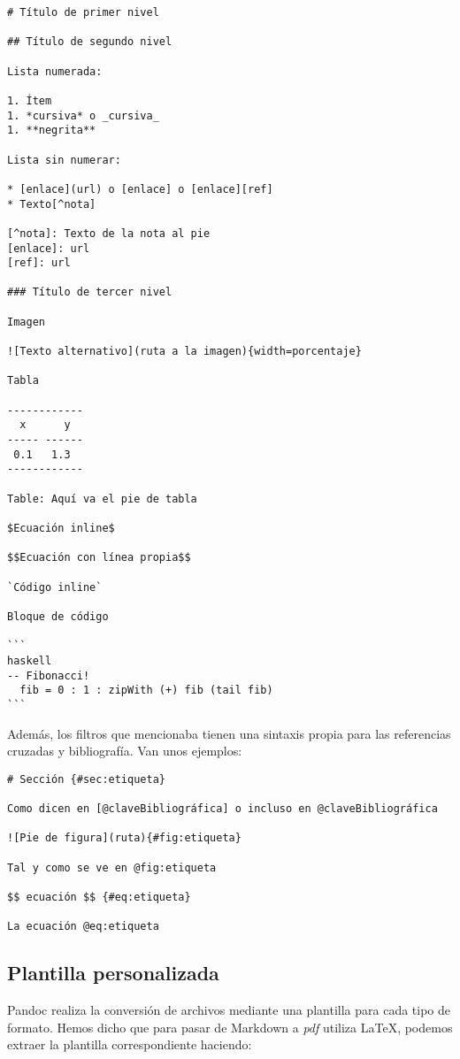 \begin{lstlisting}
# Título de primer nivel

## Título de segundo nivel

Lista numerada:

1. Ítem
1. *cursiva* o _cursiva_
1. **negrita**

Lista sin numerar:

* [enlace](url) o [enlace] o [enlace][ref]
* Texto[^nota]

[^nota]: Texto de la nota al pie
[enlace]: url
[ref]: url

### Título de tercer nivel

Imagen

![Texto alternativo](ruta a la imagen){width=porcentaje}

Tabla

------------
  x      y
----- ------
 0.1   1.3
------------

Table: Aquí va el pie de tabla

$Ecuación inline$

$$Ecuación con línea propia$$

`Código inline`

Bloque de código

```
haskell
-- Fibonacci!
  fib = 0 : 1 : zipWith (+) fib (tail fib)
```
\end{lstlisting}

Además, los filtros que mencionaba tienen una sintaxis propia para las
referencias cruzadas y bibliografía. Van unos ejemplos:

\begin{lstlisting}
# Sección {#sec:etiqueta}

Como dicen en [@claveBibliográfica] o incluso en @claveBibliográfica

![Pie de figura](ruta){#fig:etiqueta}

Tal y como se ve en @fig:etiqueta

$$ ecuación $$ {#eq:etiqueta}

La ecuación @eq:etiqueta
\end{lstlisting}

\subsection{Plantilla personalizada}

Pandoc realiza la conversión de archivos mediante una plantilla para
cada tipo de formato. Hemos dicho que para pasar de Markdown a
\emph{pdf} utiliza LaTeX, podemos extraer la plantilla correspondiente
haciendo:

